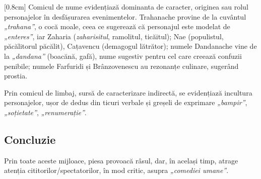 [0.8cm]
Comicul de nume evidențiază dominanta de caracter, originea sau rolul personajelor în desfășurarea evenimentelor. Trahanache provine de la cuvântul \textit{„trahana”}, o cocă moale, ceea ce sugerează că personajul este modelat de \textit{„enteres”}, iar Zaharia (\textit{zaharisitul}, ramolitul, ticăitul); Nae (populistul, păcălitorul păcălit), Cațavencu (demagogul lătrător); numele Dandanache vine de la \textit{„dandana”} (boacănă, gafă), nume sugestiv pentru cel care creează confuzii penibile; numele Farfuridi și Brânzovenescu au rezonanțe culinare, sugerând prostia.

Prin comicul de limbaj, sursă de caracterizare indirectă, se evidențiază incultura personajelor, ușor de dedus din ticuri verbale și greșeli de exprimare \textit{„bampir”}, \textit{„soțietate”}, \textit{„renumerație”}.


\subsection{Concluzie}

Prin toate aceste mijloace, piesa provoacă râsul, dar, în același timp, atrage atenția cititorilor/spectatorilor, în mod critic, asupra \textit{„comediei umane”}.

